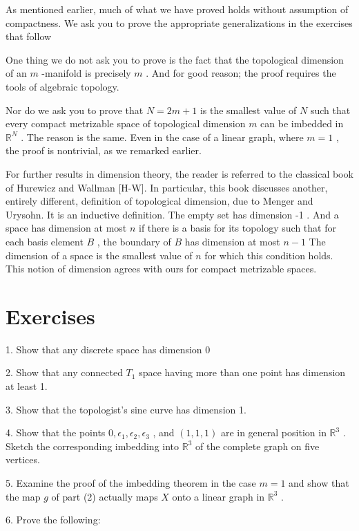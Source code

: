 \documentclass[10pt]{article}
\begin{document}
As mentioned earlier, much of what we have proved holds without assumption of compactness. We ask you to prove the appropriate generalizations in the exercises that follow

One thing we do not ask you to prove is the fact that the topological dimension of an \(m\) -manifold is precisely \(m\) . And for good reason; the proof requires the tools of algebraic topology.

Nor do we ask you to prove that \(N = {2m} + 1\) is the smallest value of \(N\) such that every compact metrizable space of topological dimension \(m\) can be imbedded in \({\mathbb{R}}^{N}\) . The reason is the same. Even in the case of a linear graph, where \(m = 1\) , the proof is nontrivial, as we remarked earlier.

For further results in dimension theory, the reader is referred to the classical book of Hurewicz and Wallman [H-W]. In particular, this book discusses another, entirely different, definition of topological dimension, due to Menger and Urysohn. It is an inductive definition. The empty set has dimension -1 . And a space has dimension at most \(n\) if there is a basis for its topology such that for each basis element \(B\) , the boundary of \(B\) has dimension at most \(n - 1\) The dimension of a space is the smallest value of \(n\) for which this condition holds. This notion of dimension agrees with ours for compact metrizable spaces.

\section*{Exercises}

1. Show that any discrete space has dimension 0

2. Show that any connected \({T}_{1}\) space having more than one point has dimension at least 1.

3. Show that the topologist's sine curve has dimension 1.

4. Show that the points \(0,{\epsilon }_{1},{\epsilon }_{2},{\epsilon }_{3}\) , and \(\left( {1,1,1}\right)\) are in general position in \({\mathbb{R}}^{3}\) . Sketch the corresponding imbedding into \({\mathbb{R}}^{3}\) of the complete graph on five vertices.

5. Examine the proof of the imbedding theorem in the case \(m = 1\) and show that the map \(g\) of part (2) actually maps \(X\) onto a linear graph in \({\mathbb{R}}^{3}\) .

6. Prove the following:
\end{document}
